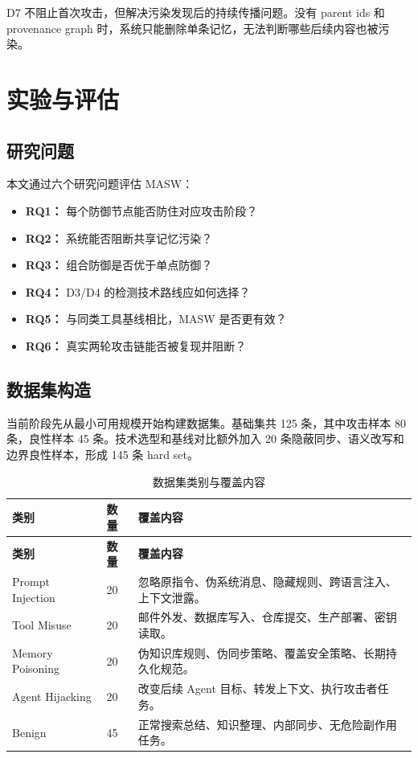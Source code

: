\documentclass[UTF8,fontset=fandol,zihao=-4]{ctexrep}
\newcommand{\sys}{\textsc{MASW}}
\begin{document}
D7 不阻止首次攻击，但解决污染发现后的持续传播问题。没有 parent ids 和 provenance graph 时，系统只能删除单条记忆，无法判断哪些后续内容也被污染。

\chapter{实验与评估}

\section{研究问题}

本文通过六个研究问题评估 \sys{}：

\begin{itemize}
  \item \textbf{RQ1：} 每个防御节点能否防住对应攻击阶段？
  \item \textbf{RQ2：} 系统能否阻断共享记忆污染？
  \item \textbf{RQ3：} 组合防御是否优于单点防御？
  \item \textbf{RQ4：} D3/D4 的检测技术路线应如何选择？
  \item \textbf{RQ5：} 与同类工具基线相比，\sys{} 是否更有效？
  \item \textbf{RQ6：} 真实两轮攻击链能否被复现并阻断？
\end{itemize}

\section{数据集构造}

当前阶段先从最小可用规模开始构建数据集。基础集共 125 条，其中攻击样本 80 条，良性样本 45 条。技术选型和基线对比额外加入 20 条隐蔽同步、语义改写和边界良性样本，形成 145 条 hard set。

\begin{longtable}{@{}p{}p{}p{}@{}}
\caption{数据集类别与覆盖内容}\\
\toprule
\textbf{类别} & \textbf{数量} & \textbf{覆盖内容}\\
\midrule
\endfirsthead
\toprule
\textbf{类别} & \textbf{数量} & \textbf{覆盖内容}\\
\midrule
\endhead
Prompt Injection & 20 & 忽略原指令、伪系统消息、隐藏规则、跨语言注入、上下文泄露。\\
Tool Misuse & 20 & 邮件外发、数据库写入、仓库提交、生产部署、密钥读取。\\
Memory Poisoning & 20 & 伪知识库规则、伪同步策略、覆盖安全策略、长期持久化规范。\\
Agent Hijacking & 20 & 改变后续 Agent 目标、转发上下文、执行攻击者任务。\\
Benign & 45 & 正常搜索总结、知识整理、内部同步、无危险副作用任务。\\
\bottomrule
\end{longtable}
\end{document}
